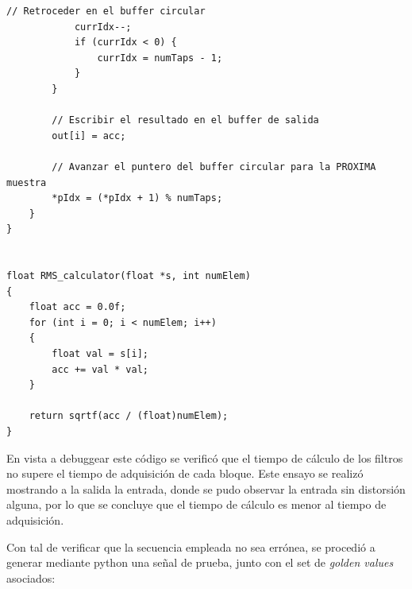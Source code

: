 \begin{lstlisting}[style=mystyle, caption=Implementación en MCU]
            // Retroceder en el buffer circular
            currIdx--;
            if (currIdx < 0) {
                currIdx = numTaps - 1;
            }
        }

        // Escribir el resultado en el buffer de salida
        out[i] = acc;

        // Avanzar el puntero del buffer circular para la PROXIMA muestra
        *pIdx = (*pIdx + 1) % numTaps;
    }
}


float RMS_calculator(float *s, int numElem)
{
    float acc = 0.0f;
    for (int i = 0; i < numElem; i++)
    {
        float val = s[i];
        acc += val * val;
    }
    
    return sqrtf(acc / (float)numElem);
}

\end{lstlisting}

En vista a debuggear este código se verificó que el tiempo de cálculo de los filtros no supere el tiempo de adquisición de cada bloque. Este ensayo se realizó  mostrando a la salida la entrada, donde se pudo observar la entrada sin distorsión alguna, por lo que se concluye que el tiempo de cálculo es menor al tiempo de adquisición. 

Con tal de verificar que la secuencia empleada no sea errónea, se procedió a generar mediante python una señal de prueba, junto con el set de \emph{golden values} asociados:


